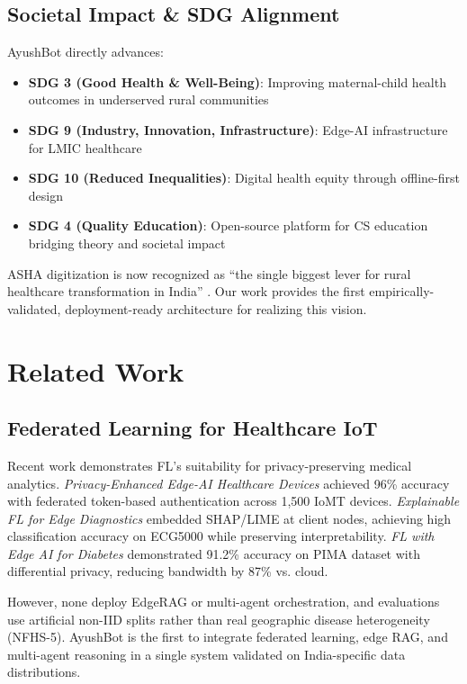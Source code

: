 \documentclass[conference,compsoc]{IEEEtran}
\begin{document}
\subsection{Societal Impact \& SDG Alignment}

AyushBot directly advances:
\begin{itemize}
    \item \textbf{SDG 3 (Good Health \& Well-Being)}: Improving maternal-child health outcomes in underserved rural communities
    \item \textbf{SDG 9 (Industry, Innovation, Infrastructure)}: Edge-AI infrastructure for LMIC healthcare
    \item \textbf{SDG 10 (Reduced Inequalities)}: Digital health equity through offline-first design
    \item \textbf{SDG 4 (Quality Education)}: Open-source platform for CS education bridging theory and societal impact
\end{itemize}

ASHA digitization is now recognized as ``the single biggest lever for rural healthcare transformation in India'' \cite{asha_digital_transformation_2025}. Our work provides the first empirically-validated, deployment-ready architecture for realizing this vision.

\section{Related Work}

\subsection{Federated Learning for Healthcare IoT}

Recent work demonstrates FL's suitability for privacy-preserving medical analytics. \textit{Privacy-Enhanced Edge-AI Healthcare Devices} \cite{fl_healthcare_auth_2025} achieved 96\% accuracy with federated token-based authentication across 1,500 IoMT devices. \textit{Explainable FL for Edge Diagnostics} \cite{explainable_fl_edge_2025} embedded SHAP/LIME at client nodes, achieving high classification accuracy on ECG5000 while preserving interpretability. \textit{FL with Edge AI for Diabetes} \cite{fl_edge_diabetes_2025} demonstrated 91.2\% accuracy on PIMA dataset with differential privacy, reducing bandwidth by 87\% vs. cloud.

However, none deploy EdgeRAG or multi-agent orchestration, and evaluations use artificial non-IID splits rather than real geographic disease heterogeneity (NFHS-5). AyushBot is the first to integrate federated learning, edge RAG, and multi-agent reasoning in a single system validated on India-specific data distributions.
\end{document}
